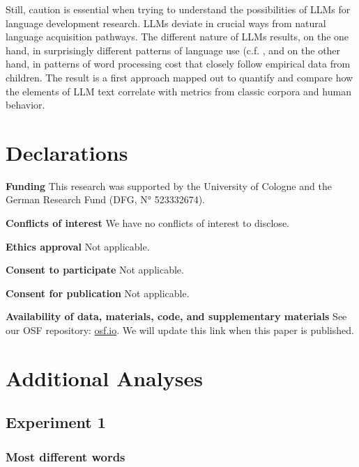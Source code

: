 \documentclass[doc, a4paper]{apa7}
\begin{document}
Still, caution is essential when trying to understand the possibilities of LLMs for language development research. LLMs deviate in crucial ways from natural language acquisition pathways. The different nature of LLMs results, on the one hand, in surprisingly different patterns of language use (c.f. \citep{vanmassenhove_machine_2021}, and on the other hand, in patterns of word processing cost that closely follow empirical data from children. The result is a first approach mapped out to quantify and compare how the elements of LLM text correlate with metrics from classic corpora and human behavior.


\section*{Declarations}

\textbf{Funding} This research was supported by the University of Cologne and the German Research Fund (DFG, N° 523332674). 

\textbf{Conflicts of interest} We have no conflicts of interest to disclose. 

\textbf{Ethics approval} Not applicable. 

\textbf{Consent to participate} Not applicable. 

\textbf{Consent for publication} Not applicable. 

\textbf{Availability of data, materials, code, and supplementary materials} See our OSF repository: \href{https://osf.io/wmuvj/?view_only=06ba6b0ec23248df8a1418add4da05a0}{osf.io}. We will update this link when this paper is published. 



\newpage
 

\newpage

\appendix

\section{Additional Analyses}

\subsection{Experiment 1}

\subsubsection{Most different words}
\end{document}
